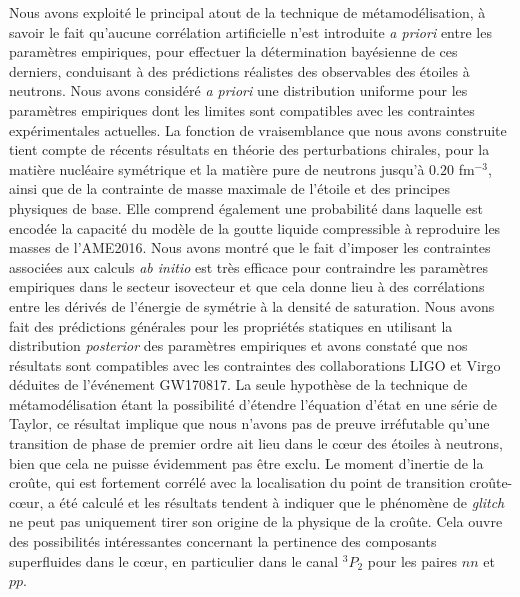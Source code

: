 Nous avons exploité le principal atout de la technique de métamodélisation, à 
savoir le fait qu'aucune corrélation artificielle n'est introduite 
\textit{a priori} entre les paramètres empiriques, pour effectuer la 
détermination bayésienne de ces derniers, conduisant à des prédictions 
réalistes des observables des étoiles à neutrons. 
Nous avons considéré \textit{a priori} une distribution uniforme pour 
les paramètres empiriques dont les limites sont compatibles avec les 
contraintes expérimentales actuelles. 
%
La fonction de vraisemblance que nous avons construite tient compte de 
récents résultats en théorie des perturbations chirales, pour la matière 
nucléaire symétrique et la matière pure de neutrons jusqu'à $0.20$ fm$^{-3}$,
ainsi que de la contrainte de masse maximale de l'étoile et des principes
physiques de base. 
Elle comprend également une probabilité dans laquelle est encodée la capacité 
du modèle de la goutte liquide compressible à reproduire les masses de 
l'AME2016. 
Nous avons montré que le fait d'imposer les contraintes 
associées aux calculs \textit{ab initio} est très efficace pour contraindre les 
paramètres empiriques dans le secteur isovecteur et que cela donne lieu à des 
corrélations entre les dérivés de l'énergie de symétrie à la densité de 
saturation.
Nous avons fait des prédictions générales pour les propriétés statiques en 
utilisant la distribution \textit{posterior} des paramètres empiriques et avons 
constaté que nos résultats sont compatibles avec les contraintes des 
collaborations LIGO et Virgo déduites de l'événement GW170817. 
%
La seule hypothèse de la technique de métamodélisation étant la 
possibilité d'étendre l'équation d'état en une série de Taylor, ce résultat 
implique que nous n'avons pas de preuve irréfutable qu'une transition de 
phase de premier ordre ait lieu dans le c\oe ur des étoiles à neutrons, bien 
que cela ne puisse évidemment pas être exclu. 
%
Le moment d'inertie de la croûte, qui est fortement corrélé avec la 
localisation du point de transition croûte-c\oe ur, a été calculé et les
résultats tendent à indiquer que le phénomène de \textit{glitch} ne peut pas 
uniquement tirer son origine de la physique de la croûte. 
Cela ouvre des possibilités intéressantes concernant la pertinence des 
composants superfluides dans le c\oe ur, en particulier dans le canal $^3P_2$ 
pour les paires $nn$ et $pp$.

